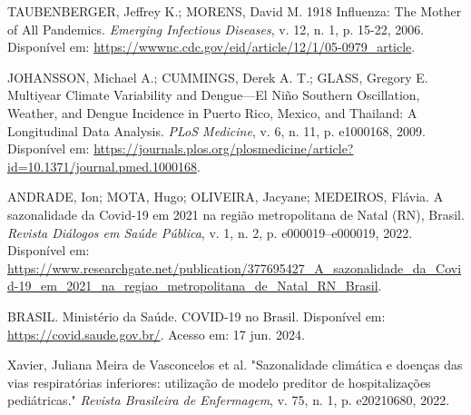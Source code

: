 \documentclass[a4paper,12pt]{report}
\begin{document}
\begin{thebibliography}{99}
TAUBENBERGER, Jeffrey K.; MORENS, David M. 1918 Influenza: The Mother of All Pandemics. \textit{Emerging Infectious Diseases}, v. 12, n. 1, p. 15-22, 2006. Disponível em: \url{https://wwwnc.cdc.gov/eid/article/12/1/05-0979_article}. 

JOHANSSON, Michael A.; CUMMINGS, Derek A. T.; GLASS, Gregory E. Multiyear Climate Variability and Dengue—El Niño Southern Oscillation, Weather, and Dengue Incidence in Puerto Rico, Mexico, and Thailand: A Longitudinal Data Analysis. \textit{PLoS Medicine}, v. 6, n. 11, p. e1000168, 2009. Disponível em: \url{https://journals.plos.org/plosmedicine/article?id=10.1371/journal.pmed.1000168}. 

ANDRADE, Ion; MOTA, Hugo; OLIVEIRA, Jacyane; MEDEIROS, Flávia. A sazonalidade da Covid-19 em 2021 na região metropolitana de Natal (RN), Brasil. \textit{Revista Diálogos em Saúde Pública}, v. 1, n. 2, p. e000019--e000019, 2022. Disponível em: \url{https://www.researchgate.net/publication/377695427_A_sazonalidade_da_Covid-19_em_2021_na_regiao_metropolitana_de_Natal_RN_Brasil}. 

BRASIL. Ministério da Saúde. COVID-19 no Brasil. Disponível em: \url{https://covid.saude.gov.br/}. Acesso em: 17 jun. 2024.

Xavier, Juliana Meira de Vasconcelos et al. "Sazonalidade climática e doenças das vias respiratórias inferiores: utilização de modelo preditor de hospitalizações pediátricas." \textit{Revista Brasileira de Enfermagem}, v. 75, n. 1, p. e20210680, 2022.

\end{thebibliography}
\end{document}
